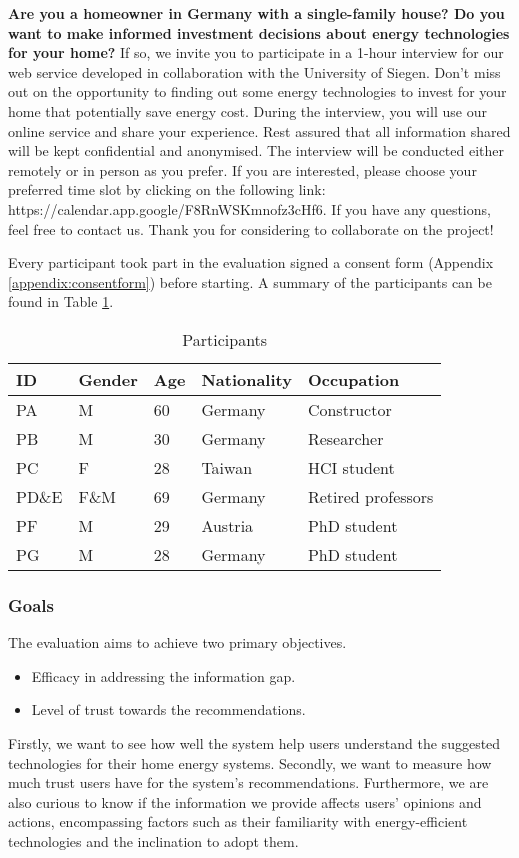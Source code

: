 \textbf{Are you a homeowner in Germany with a single-family house? 
Do you want to make informed investment decisions about energy technologies for your home? }
If so, we invite you to participate in a 1-hour interview for our web service developed in collaboration with the University of Siegen.
Don't miss out on the opportunity to finding out some energy technologies to invest for your home that potentially save energy cost. 
During the interview, you will use our online service and share your experience.
Rest assured that all information shared will be kept confidential and anonymised. 
The interview will be conducted either remotely or in person as you prefer. 
If you are interested, please choose your preferred time slot by clicking on the following link: https://calendar.app.google/F8RnWSKmnofz3cHf6. 
If you have any questions, feel free to contact us.
Thank you for considering to collaborate on the project!

Every participant took part in the evaluation signed a consent form (Appendix \ref{appendix:consentform}) before starting. 
A summary of the participants can be found in Table \ref{tab:participants}.
\begin{table}[h!]
  \centering
  \begin{tabular}{ | p{} | p{} | p{} | p{} | p{} | } 
    \hline
    ID & Gender & Age & Nationality & Occupation \\
    \hline
    PA & M & 60 & Germany & Constructor \\
    \hline
    PB & M & 30 & Germany & Researcher \\
    \hline
    PC & F & 28 & Taiwan & HCI student \\
    \hline
    PD\&E & F\&M & 69 & Germany & Retired professors \\
    \hline
    PF & M & 29 & Austria & PhD student \\
    \hline
    PG & M & 28 & Germany & PhD student \\
    \hline
  \end{tabular}
  \caption{Participants}
  \label{tab:participants}
\end{table}


\subsubsection{Goals}

The evaluation aims to achieve two primary objectives.
\begin{itemize}
  \item Efficacy in addressing the information gap.
  \item Level of trust towards the recommendations.
\end{itemize}
Firstly, we want to see how well the system help users understand the suggested technologies for their home energy systems. 
Secondly, we want to measure how much trust users have for the system's recommendations. 
Furthermore, we are also curious to know if the information we provide affects users' opinions and actions, 
encompassing factors such as their familiarity with energy-efficient technologies and the inclination to adopt them.


